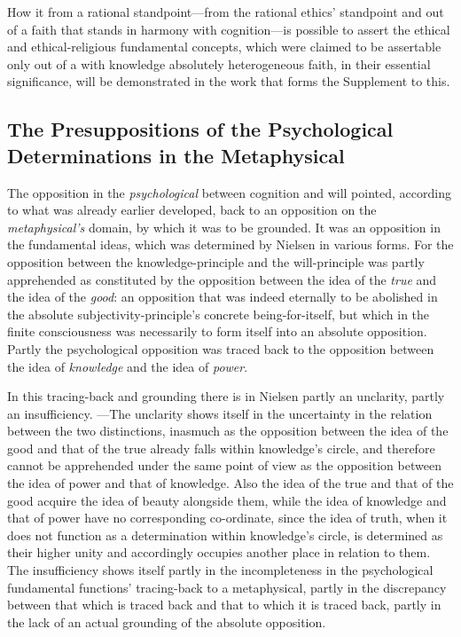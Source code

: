 \documentclass[12pt,a4paper]{book}
\begin{document}
How it from a rational standpoint---from the rational ethics' standpoint and out of a faith that stands in harmony
with cognition---is possible to assert the ethical and ethical-religious fundamental concepts, which were claimed
to be assertable only out of a with knowledge absolutely heterogeneous faith, in their essential significance,
will be demonstrated in the work that forms the Supplement to this.

\subsection{The Presuppositions of the Psychological Determinations
  in the Metaphysical}
\label{ssec:metaphysical}

The opposition in the \emph{psychological} between cognition and will pointed, according to what was
already earlier developed, back to an opposition on the \emph{metaphysical's} domain, by which it was
to be grounded. It was an opposition in the fundamental ideas, which was determined by Nielsen
in various forms. For the opposition between the knowledge-principle and the will-principle was
partly apprehended as constituted by the opposition between the idea of the \emph{true} and
the idea of the \emph{good}: an opposition that was indeed eternally to be abolished in the
absolute subjectivity-principle's concrete being-for-itself, but which in the finite
consciousness was necessarily to form itself into an absolute opposition. Partly the
psychological opposition was traced back to the opposition between the idea of \emph{knowledge} and the
idea of \emph{power}.

In this tracing-back and grounding there is in Nielsen partly an unclarity, partly an
insufficiency. ---The unclarity shows itself in the uncertainty in the relation between the two
distinctions, inasmuch as the opposition between the idea of the good and that of the true already
falls within knowledge's circle, and therefore cannot be apprehended under the same point of view
as the opposition between the idea of power and that of knowledge. Also the idea of the true and
that of the good acquire the idea of beauty alongside them, while the idea of knowledge and that
of power have no corresponding co-ordinate, since the idea of truth, when it does not function as
a determination within knowledge's circle, is determined as their higher unity and accordingly
occupies another place in relation to them. The insufficiency shows itself partly in the
incompleteness in the psychological fundamental functions' tracing-back to a metaphysical, partly
in the discrepancy between that which is traced back and that to which it is traced back, partly
in the lack of an actual grounding of the absolute opposition.
\end{document}
